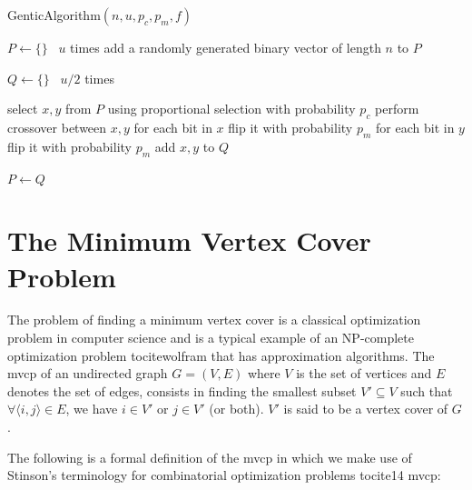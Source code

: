 \documentclass[12pt]{article}
\begin{document}
\begin{algorithm}
\caption{GenticAlgorithm$\left( n, u, p_c, p_m, f \right)$}
\label{alg:ga}

\begin{algorithmic}[1]


\State $ P \gets \{ \} $
\Loop \ $u$ times
\State add a randomly generated binary vector of length $n$ to $P$
\EndLoop

\State $Q \gets \{ \}$
\Loop \ $u/2$ times

\State select $x, y$ from $P$ using proportional selection
\State with probability $p_c$ perform crossover between $x, y$
\label{alg:crossover}
\State for each bit in $x$ flip it with probability $p_m$
\label{alg:m1}
\State for each bit in $y$ flip it with probability $p_m$
\label{alg:m2}
\State add $x, y$ to $Q$

\EndLoop

\State $P \gets Q$
\EndWhile


\end{algorithmic}

\end{algorithm}



\section{The Minimum Vertex Cover Problem}
The problem of finding a minimum vertex cover is a classical
optimization problem in computer science and is a typical
example of an NP-complete optimization problem tocite{wolfram}
that has approximation algorithms.
The mvcp of an undirected graph $G = (V, E)$ where $V$ is
the set of vertices and $E$ denotes the set of edges,
consists in finding the smallest subset $V' \subseteq V$ such that
$\forall \langle i, j \rangle \in E$, we have $i \in V'$ or $j \in V'$ (or both).
$V'$ is said to be a vertex cover of $G$.

The following is a formal definition of
the mvcp in which we make use of Stinson's terminology
for combinatorial optimization problems tocite{14 mvcp}:
\end{document}

